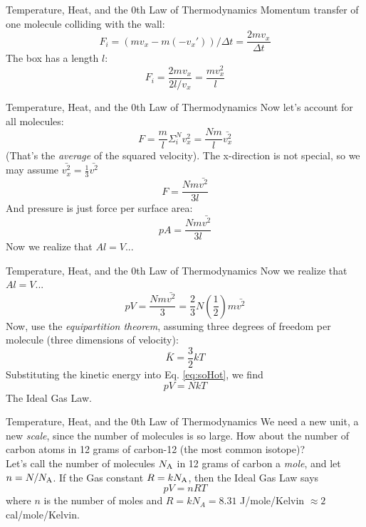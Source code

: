 \documentclass{beamer}
\begin{document}
\begin{frame}{Temperature, Heat, and the 0th Law of Thermodynamics}
Momentum transfer of one molecule colliding with the wall: \\
\begin{equation}
F_i = (mv_{x} - m(-v_{x}'))/\Delta t = \frac{2mv_x}{\Delta t}
\end{equation}
The box has a length $l$:
\begin{equation}
F_i = \frac{2mv_x}{2l/v_x} = \frac{mv_x^2}{l}
\end{equation}
\end{frame}

\begin{frame}{Temperature, Heat, and the 0th Law of Thermodynamics}
Now let's account for all molecules:
\begin{equation}
F = \frac{m}{l}\Sigma_i^N v_x^2 = \frac{Nm}{l} \bar{v_x^2}
\end{equation}
(That's the \textit{average} of the squared velocity).  The x-direction is not special, so we may assume $\bar{v_x^2} = \frac{1}{3}\bar{v^2}$
\begin{equation}
F = \frac{Nm\bar{v^2}}{3l}
\end{equation}
And pressure is just force per surface area:
\begin{equation}
pA = \frac{Nm\bar{v^2}}{3l}
\end{equation}
Now we realize that $Al = V$...
\end{frame}

\begin{frame}{Temperature, Heat, and the 0th Law of Thermodynamics}
Now we realize that $Al = V$...
\begin{equation}
pV = \frac{Nm\bar{v^2}}{3} = \frac{2}{3} N \left(\frac{1}{2}\right) m \bar{v^2}
\label{eq:soHot}
\end{equation}
Now, use the \textit{equipartition theorem}, assuming three degrees of freedom per molecule (three dimensions of velocity):
\begin{equation}
\bar{K} = \frac{3}{2}kT
\end{equation}
Substituting the kinetic energy into Eq. \ref{eq:soHot}, we find
\begin{equation}
\boxed{
pV = NkT}
\end{equation}
The Ideal Gas Law.
\end{frame}

\begin{frame}{Temperature, Heat, and the 0th Law of Thermodynamics}
We need a new unit, a new \textit{scale}, since the number of molecules is so large.  How about the number of carbon atoms in 12 grams of carbon-12 (the most common isotope)? \\ \vspace{0.5cm}
Let's call the number of molecules $N_{\rm A}$ in 12 grams of carbon a \alert{\textit{mole}}, and let $n = N/N_{\rm A}$.  If the \alert{Gas constant} $R = kN_{\rm A}$, then the Ideal Gas Law says
\begin{equation}
pV = nRT
\end{equation}
where $n$ is the number of moles and $R = kN_A = 8.31$ J/mole/Kelvin $\approx 2$ cal/mole/Kelvin.
\end{frame}
\end{document}
